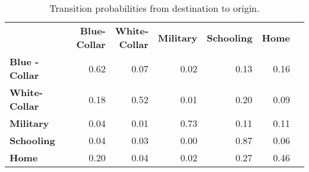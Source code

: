 \begin{ThreePartTable}

	\begin{longtable}[c]{@{}lrrrrrr@{}}
		\caption{Transition probabilities from destination to origin.}
		\label{tab:TransitionProbabilitiesDestinationToOrigin}

		\setlength\extrarowheight{2.5pt}
		
		\\
		\toprule
   & \thead{\textbf{Blue-} \\ \textbf{Collar}}    & \thead{\textbf{White-} \\ \textbf{Collar}}  & \textbf{Military} & \textbf{Schooling} & \textbf{Home}   \\ \midrule
		\endfirsthead
		
\textbf{Blue	-Collar }&	0.62	&	0.07	&	0.02	&	0.13	&	0.16	\\
\textbf{White-Collar	}&	0.18	&	0.52	&	0.01	&	0.20	&	0.09	\\
\textbf{Military}	&	0.04	&	0.01	&	0.73	&	0.11	&	0.11	\\
\textbf{Schooling}	&	0.04	&	0.03	&	0.00	&	0.87	&	0.06	\\
\textbf{Home}	&	0.20	&	0.04	&	0.02	&	0.27	&	0.46	\\
  \bottomrule
	\end{longtable}
\end{ThreePartTable}
